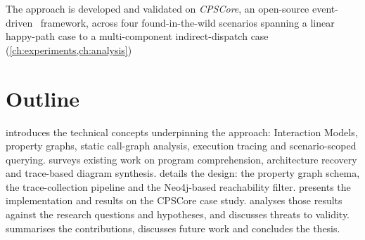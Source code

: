 The approach is developed and validated on \emph{CPSCore}, an
open-source event-driven \Cpp\ framework, across four found-in-the-wild
scenarios spanning a linear happy-path case to a multi-component
indirect-dispatch case (\cref{ch:experiments,ch:analysis})

\section{Outline}

 introduces the technical concepts underpinning the
approach: \sysml Interaction Models, property graphs, static call-graph
analysis, execution tracing and scenario-scoped querying.
 surveys existing work on program comprehension,
architecture recovery and trace-based diagram synthesis. 
details the design: the property graph schema, the trace-collection
pipeline and the Neo4j-based reachability filter. 
presents the implementation and results on the CPSCore case study.
 analyses those results against the research questions
and hypotheses, and discusses threats to validity. 
summarises the contributions, discusses future work and concludes the
thesis.
